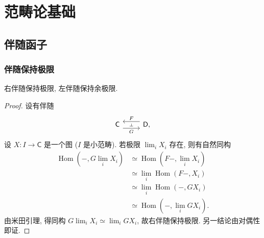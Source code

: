 \chapter{范畴论基础}

\section{伴随函子}

\subsection{伴随保持极限}

\begin{prop}
	[label={adjoints-preserve-limits}]
	{}
	右伴随保持极限, 左伴随保持余极限.
\end{prop}

\begin{proof}
	设有伴随
	\[\begin{tikzcd}[ampersand replacement=\&]
		{\mathsf {C}} \& {\mathsf {D},}
		\arrow[""{name=0, anchor=center, inner sep=0}, "F"', shift right=2, from=1-2, to=1-1]
		\arrow[""{name=1, anchor=center, inner sep=0}, "G"', shift right=2, from=1-1, to=1-2]
		\arrow["\dashv"{anchor=center, rotate=-90}, draw=none, from=0, to=1]
	\end{tikzcd}\]
	设 $X \colon I \to \mathsf C$ 是一个图 ($I$ 是小范畴).
	若极限 $\lim_i X_i$ 存在,
	则有自然同构
	\begin{align*}
		\operatorname{Hom}(-,G\lim_i X_i)
		&\simeq \operatorname{Hom}(F-,\lim_i X_i)\\
		&\simeq \lim_i \operatorname{Hom}(F-,X_i)\\
		&\simeq \lim_i \operatorname{Hom}(-,GX_i)\\
		&\simeq \operatorname{Hom}(-,\lim_i GX_i).
	\end{align*}
	由米田引理, 得同构 $G\lim_i X_i \simeq \lim_i GX_i$,
	故右伴随保持极限.
	另一结论由对偶性即证.
\end{proof}

